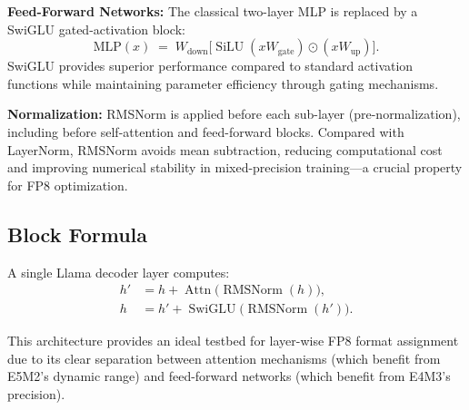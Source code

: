 \textbf{Feed-Forward Networks:} The classical two-layer MLP is replaced by a SwiGLU gated-activation block:
\[
\mathrm{MLP}(x)\;=\;W_\text{down}\bigl[\operatorname{SiLU}(xW_\text{gate})
\odot(xW_\text{up})\bigr].
\]
SwiGLU provides superior performance compared to standard activation functions while maintaining parameter efficiency through gating mechanisms.

\textbf{Normalization:} RMSNorm is applied before each sub-layer (pre-normalization), including before self-attention and feed-forward blocks. Compared with LayerNorm, RMSNorm avoids mean subtraction, reducing computational cost and improving numerical stability in mixed-precision training—a crucial property for FP8 optimization.

\subsection{Block Formula}
A single Llama decoder layer computes:
\begin{align}
h' &= h + \operatorname{Attn}\!\bigl(\operatorname{RMSNorm}(h)\bigr), \\
h  &= h' + \operatorname{SwiGLU}\!\bigl(\operatorname{RMSNorm}(h')\bigr).
\end{align}

This architecture provides an ideal testbed for layer-wise FP8 format assignment due to its clear separation between attention mechanisms (which benefit from E5M2's dynamic range) and feed-forward networks (which benefit from E4M3's precision).

